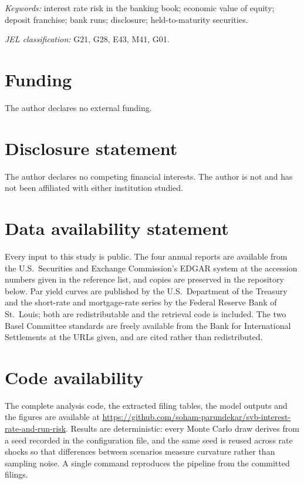 \documentclass[11pt,letterpaper]{article}
\begin{document}
\noindent\textit{Keywords:} interest rate risk in the banking book; economic value of
equity; deposit franchise; bank runs; disclosure; held-to-maturity securities.\par
\noindent\textit{JEL classification:} G21, G28, E43, M41, G01.
\vspace{8pt}











\section*{Funding}
The author declares no external funding.

\section*{Disclosure statement}
The author declares no competing financial interests. The author is not and has not
been affiliated with either institution studied.

\section*{Data availability statement}
Every input to this study is public. The four annual reports are available from the
U.S.\ Securities and Exchange Commission's EDGAR system at the accession numbers
given in the reference list, and copies are preserved in the repository below. Par
yield curves are published by the U.S.\ Department of the Treasury and the short-rate
and mortgage-rate series by the Federal Reserve Bank of St.\ Louis; both are
redistributable and the retrieval code is included. The two Basel Committee standards
are freely available from the Bank for International Settlements at the URLs given,
and are cited rather than redistributed.

\section*{Code availability}
The complete analysis code, the extracted filing tables, the model outputs and the
figures are available at \url{https://github.com/soham-parundekar/svb-interest-rate-and-run-risk}.
Results are deterministic: every Monte Carlo draw derives from a seed recorded in the
configuration file, and the same seed is reused across rate shocks so that
differences between scenarios measure curvature rather than sampling noise. A single
command reproduces the pipeline from the committed filings.
\end{document}
